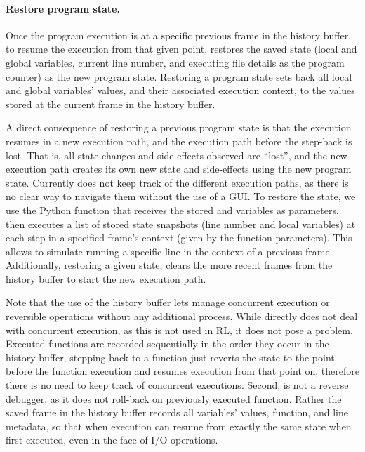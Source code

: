 \paragraph{Restore program state.}    
Once the program execution is at a specific previous frame in the history buffer, to resume the 
execution from that given point, \flik restores the saved state (\ie local and global variables, current 
line number, and executing file details as the program counter) as the new program state. Restoring a 
program state sets back all local and global variables' values, and their associated execution context, 
to the values stored at the current frame in the history buffer.

A direct consequence of restoring a previous program state is that the execution resumes in a new 
execution path, and the execution path before the step-back is lost. That is, all state changes and 
side-effects observed are ``lost'', and the new execution path creates its own new state and 
side-effects using the new program state. Currently \flik does not keep track of the different 
execution paths, as there is no clear way to navigate them without the use of a GUI. To restore the 
state, we use the  Python function that receives the stored  and  
variables as parameters.  then executes a list of stored state snapshots (line number 
and local variables) at each step in a specified frame's context (given by the function parameters). 
This allows \flik to simulate running a specific line in the context of a previous frame. Additionally, 
restoring a given state, clears the more recent frames from the history buffer to start the new 
execution path.

Note that the use of the history buffer lets \flik manage concurrent execution or reversible operations 
without any additional process. While \flik directly does not deal with concurrent execution, as this is 
not used in \ac{RL}, it does not pose a problem. Executed functions are recorded sequentially in the 
order they occur in the history buffer, stepping back to a function just reverts the state to the point 
before the function execution and resumes execution from that point on, therefore there is no need to 
keep track of concurrent executions. Second, \flik is not a reverse debugger, as it does not roll-back 
on previously executed function. Rather the saved frame in the history buffer records all variables' 
values, function, and line metadata, so that when execution can resume from exactly the same state 
when first executed, even in the face of I/O operations.

